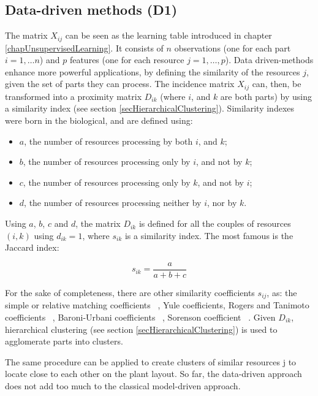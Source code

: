 \subsection{Data-driven methods (D1)}

The matrix $X_{ij}$ can be seen as the learning table introduced in chapter \ref{chapUnsupervisedLearning}. It consists of $n$ observations (one for each part $i=1,\ldots n$) and $p$ features (one for each resource $j=1,\ldots,p$). Data driven-methods enhance more powerful applications, by defining the similarity of the resources $j$, given the set of parts they can process. The incidence matrix $X_{ij}$ can, then, be transformed into a proximity matrix $D_{ik}$ (where $i$, and $k$ are both parts) by using a similarity index (see section \ref{secHierarchicalClustering}). Similarity indexes were born in the biological, and are defined using:

\begin{itemize}
    \item $a$, the number of resources processing by both $i$, and $k$;
	\item $b$, the number of resources processing only by $i$, and not by $k$;
	\item $c$, the number of resources processing only by $k$, and not by $i$;
	\item $d$, the number of resources processing neither by $i$, nor by $k$.

\end{itemize}

Using $a$, $b$, $c$ and $d$, the matrix $D_{ik}$ is defined for all the couples of resources $(i,k)$ using $d_{ik}=1$, where $s_{ik}$ is a similarity index. The most famous is the Jaccard index:

\begin{equation}
    s_{ik}=\frac{a}{a+b+c}
\end{equation}

For the sake of completeness, there are other similarity coefficients $s_{ij}$, as: the simple or relative matching coefficients ~\cite{Heltshe1988}, Yule coefficients, Rogers and Tanimoto coefficients ~\cite{Jackson1989}, Baroni-Urbani coefficients ~\cite{Buser1976}, Sorenson coefficient ~\cite{Yin2005}. Given $D_{ik}$, hierarchical clustering (see section \ref{secHierarchicalClustering}) is used to agglomerate parts into clusters.\par

The same procedure can be applied to create clusters of similar resources j to locate close to each other on the plant layout. So far, the data-driven approach does not add too much to the classical model-driven approach.\par

